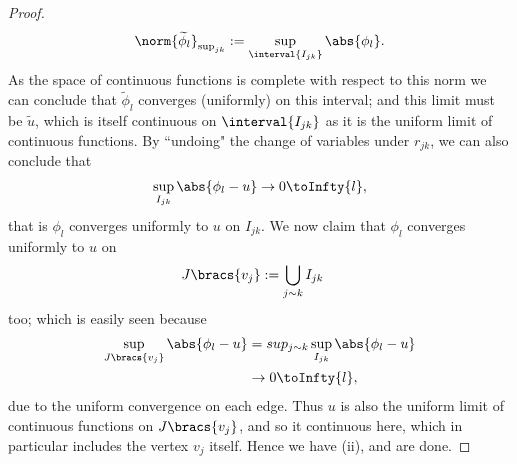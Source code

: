 \begin{proof}
	\begin{align*}
		\norm{\widetilde{\phi}_l}_{\mathrm{sup}_{jk}} := \sup_{\interval{I_{jk}}}\abs{\phi_l}.
	\end{align*}
	As the space of continuous functions is complete with respect to this norm we can conclude that $\widetilde{\phi}_l$ converges (uniformly) on this interval; and this limit must be $\widetilde{u}$, which is itself continuous on $\interval{I_{jk}}$ as it is the uniform limit of continuous functions.
	By ``undoing" the change of variables under $r_{jk}$, we can also conclude that
	\begin{align*}
		\sup_{I_{jk}}\abs{\phi_l - u}\rightarrow0 \toInfty{l},
	\end{align*}
	that is $\phi_l$ converges uniformly to $u$ on $I_{jk}$.
	We now claim that $\phi_l$ converges uniformly to $u$ on
	\begin{align*}
		J\bracs{v_j} &:= \bigcup_{j\sim k}I_{jk}
	\end{align*}
	too; which is easily seen because
	\begin{align*}
		\sup_{J\bracs{v_j}}\abs{\phi_l - u} &= sup_{j\sim k}\sup_{I_{jk}}\abs{\phi_l - u} \\
		&\rightarrow0 \toInfty{l},
	\end{align*}
	due to the uniform convergence on each edge.
	Thus $u$ is also the uniform limit of continuous functions on $J\bracs{v_j}$, and so it continuous here, which in particular includes the vertex $v_j$ itself.
	Hence we have (ii), and are done.
\end{proof}

